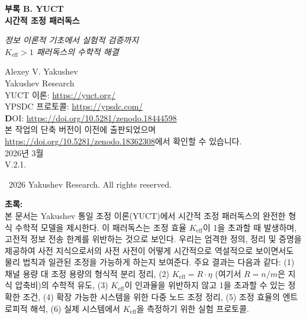 \documentclass[12pt,a4paper]{article}
\begin{document}
	
	\begin{titlepage}
		\begin{center}
			\vspace*{0cm}
			\Huge\textbf{부록 B. YUCT\\
				시간적 조정 패러독스}
			
			\vspace{0cm}
			\LARGE\textit{정보 이론적 기초에서 실험적 검증까지 \\[0.3cm]
				$K_{\text{eff}} > 1$ 패러독스의 수학적 해결}
			
			\vspace{1cm}
			\Large
			Alexey V. Yakushev\\
			Yakushev Research\\
			YUCT 이론: \url{https://yuct.org/}\\
			YPSDC 프로토콜: \url{https://ypsdc.com/}\\
			
			\vspace{2cm}
			\textbf DOI: \url{https://doi.org/10.5281/zenodo.18444598}\\
			
			\vspace{1cm}
			\large 
			본 작업의 단축 버전이 이전에 출판되었으며\\ \url{https://doi.org/10.5281/zenodo.18362308}에서 확인할 수 있습니다.\\
			\vspace{1cm}
			2026년 3월 \\ \large V.2.1.
			
			\vspace{5cm}
			\textcopyright~2026 Yakushev Research. All rights reserved.
			
			\newpage
			\vfill
			\normalsize
			\begin{minipage}{0.8\textwidth}
				\centering
				\textbf{초록:} \\ 본 문서는 Yakushev 통일 조정 이론(YUCT)에서 시간적 조정 패러독스의 완전한 형식 수학적 모델을 제시한다. 이 패러독스는 조정 효율 $K_{\text{eff}}$이 1을 초과할 때 발생하며, 고전적 정보 전송 한계를 위반하는 것으로 보인다. 우리는 엄격한 정의, 정리 및 증명을 제공하여 사전 지식으로서의 사전 사전이 어떻게 시간적으로 역설적으로 보이면서도 물리 법칙과 일관된 조정을 가능하게 하는지 보여준다. 주요 결과는 다음과 같다: (1) 채널 용량 대 조정 용량의 형식적 분리 정리, (2) $K_{\text{eff}} = R \cdot \eta$ (여기서 $R = n/m$은 지식 압축비)의 수학적 유도, (3) $K_{\text{eff}}$이 인과율을 위반하지 않고 1을 초과할 수 있는 정확한 조건, (4) 확장 가능한 시스템을 위한 다중 노드 조정 정리, (5) 조정 효율의 엔트로피적 해석, (6) 실제 시스템에서 $K_{\text{eff}}$을 측정하기 위한 실험 프로토콜.
			\end{minipage}
			

\end{center}
\end{titlepage}
\end{document}
